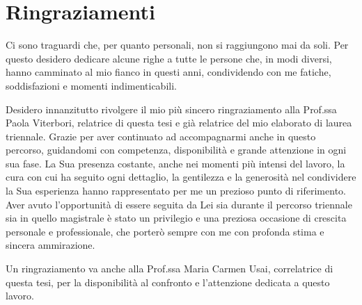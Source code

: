 \chapter*{Ringraziamenti}
\vspace*{\dimexpr 3\baselineskip - 3.2pt\relax}
\pagestyle{empty}
\thispagestyle{empty}

\setlength{\parskip}{1em}


Ci sono traguardi che, per quanto personali, non si raggiungono mai da soli. Per questo desidero dedicare alcune righe a tutte le persone che, in modi diversi, hanno camminato al mio fianco in questi anni, condividendo con me fatiche, soddisfazioni e momenti indimenticabili.

Desidero innanzitutto rivolgere il mio più sincero ringraziamento alla Prof.ssa Paola Viterbori, relatrice di questa tesi e già relatrice del mio elaborato di laurea triennale. Grazie per aver continuato ad accompagnarmi anche in questo percorso, guidandomi con competenza, disponibilità e grande attenzione in ogni sua fase. La Sua presenza costante, anche nei momenti più intensi del lavoro, la cura con cui ha seguito ogni dettaglio, la gentilezza e la generosità nel condividere la Sua esperienza hanno rappresentato per me un prezioso punto di riferimento. Aver avuto l'opportunità di essere seguita da Lei sia durante il percorso triennale sia in quello magistrale è stato un privilegio e una preziosa occasione di crescita personale e professionale, che porterò sempre con me con profonda stima e sincera ammirazione.

Un ringraziamento va anche alla Prof.ssa Maria Carmen Usai, correlatrice di questa tesi, per la disponibilità al confronto e l'attenzione dedicata a questo lavoro.

